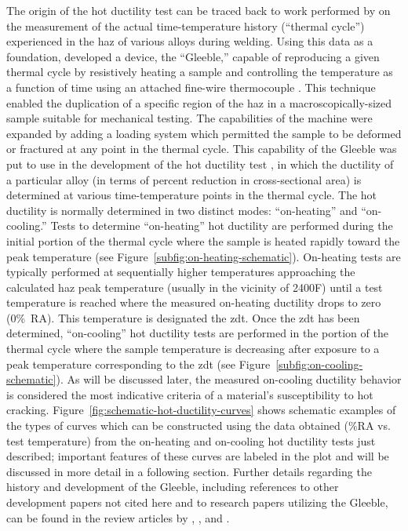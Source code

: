 The origin of the hot ductility test can be traced back to work performed by \citet{nippes_cooling_1949} on the measurement of the actual time-temperature history (“thermal cycle”) experienced in the \gls{haz} of various alloys during welding.  Using this data as a foundation, \citeauthor{nippes_development_1949} developed a device, the “Gleeble,” capable of reproducing a given thermal cycle by resistively heating a sample and controlling the temperature as a function of time using an attached fine-wire thermocouple \cite{nippes_development_1949}. This technique enabled the duplication of a specific region of the \gls{haz} in a macroscopically-sized sample suitable for mechanical testing.  The capabilities of the machine were expanded by adding a loading system which permitted the sample to be deformed or fractured at any point in the thermal cycle.  This capability of the Gleeble was put to use in the development of the hot ductility test \cite{nippes_investigation_1955}, in which the ductility of a particular alloy (in terms of percent reduction in cross-sectional area) is determined at various time-temperature points in the thermal cycle.  The hot ductility is normally determined in two distinct modes: “on-heating” and “on-cooling.”  Tests to determine “on-heating” hot ductility are performed during the initial portion of the thermal cycle where the sample is heated rapidly toward the peak temperature (see Figure~\ref{subfig:on-heating-schematic}).  On-heating tests are typically performed at sequentially higher temperatures approaching the calculated \gls{haz} peak temperature (usually in the vicinity of 2400\textdegree{}F) until a test temperature is reached where the measured on-heating ductility drops to zero (0\%~RA).  This temperature is designated the \gls{zdt}.  Once the \gls{zdt} has been determined, “on-cooling” hot ductility tests are performed in the portion of the thermal cycle where the sample temperature is decreasing after exposure to a peak temperature corresponding to the \gls{zdt} (see Figure~\ref{subfig:on-cooling-schematic}).  As will be discussed later, the measured on-cooling ductility behavior is considered the most indicative criteria of a material’s susceptibility to hot cracking.  Figure~\ref{fig:schematic-hot-ductility-curves} shows schematic examples of the types of curves which can be constructed using the data obtained (\%RA vs. test temperature) from the on-heating and on-cooling hot ductility tests just described; important features of these curves are labeled in the plot and will be discussed in more detail in a following section. Further details regarding the history and development of the Gleeble, including references to other development papers not cited here and to research papers utilizing the Gleeble, can be found in the review articles by \citet{savage_apparatus_1962}, \citet{lundin_historical_1997}, and \citet{lundin_standardization_1990_history}. 

